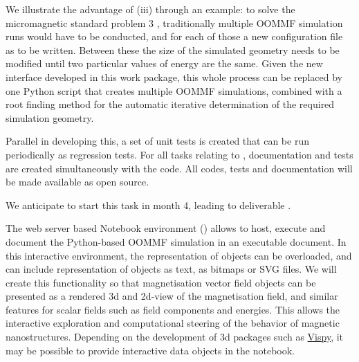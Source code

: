 \begin{workpackage}
\begin{tasklist}
\begin{task}[lead=USO,id=oommf-python-interface,title=OOMMF case study: Create Python interface to OOMMF code,PM=6]

  We illustrate the advantage of (iii) through an example: to solve
  the micromagnetic standard problem 3
  \cite{Micromagnetic-Standardproblem-3}, traditionally multiple OOMMF
  simulation runs would have to be conducted, and for each of those a
  new configuration file as to be written. Between these the size of
  the simulated geometry needs to be modified until two particular
  values of energy are the same. Given the new interface developed in
  this work package, this whole process can be replaced by one Python
  script that creates multiple OOMMF simulations, combined with a root
  finding method for the automatic iterative determination of the
  required simulation geometry.

  Parallel in developing this, a set of unit tests is created that can
  be run periodically as regression tests. For all tasks relating to
  \OOMMFNB, documentation and tests are created simultaneously with
  the code. All codes, tests and documentation will be made available as open source.

  We anticipate to start this task 
  in month 4, leading to deliverable .
\end{task}

\begin{task}[lead=USO,title=OOMMF case study: Extend \texttt{OOMMF-py} with \Jupyter
    notebook attributes and GUI templates,id=oommf-py-ipython-attributes,PM=6]

  The web server based Notebook environment (\Jupyter) allows to host,
  execute and document the Python-based OOMMF simulation in an
  executable document. In this interactive environment, the
  representation of objects can be overloaded, and can include
  representation of objects as text, as bitmaps or SVG files. We will
  create this functionality so that magnetisation vector field objects
  can be presented as a rendered 3d and 2d-view of the magnetisation
  field, and similar features for scalar fields such as field
  components and energies. This allows the interactive exploration and
  computational steering of the behavior of magnetic
  nanostructures. Depending on the development of 3d packages such as
  \href{http://vispy.org}{Vispy},
  it may be possible to provide interactive data objects in the
  notebook.


\end{task}
\end{tasklist}
\end{workpackage}
